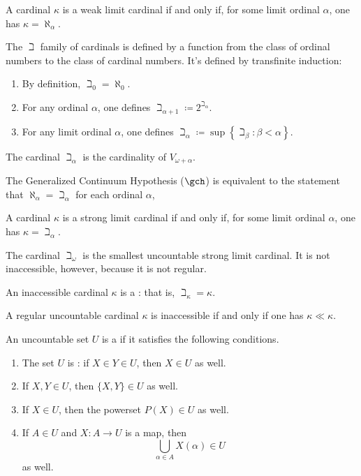 \begin{eg}
	A cardinal $ \kappa $ is a weak limit cardinal if and only if,
	for some limit ordinal $ \alpha $, one has $ \kappa = \aleph_{\alpha} $.
\end{eg}

\begin{eg}
	The $\beth$ family of cardinals is defined by a function from the class of ordinal numbers to the class of cardinal numbers.
	It's defined by transfinite induction:
	\begin{enumerate}
		\item By definition, $ \beth_0 = \aleph_0 $.
		\item For any ordinal $ \alpha $, one defines $ \beth_{\alpha+1} \coloneq 2^{\beth_{\alpha}} $.
		\item For any limit ordinal $ \alpha $,
			one defines $ \beth_{\alpha} \coloneq \sup \left\{ \beth_{\beta} : \beta < \alpha \right\} $.
	\end{enumerate}
	The cardinal $ \beth_{\alpha} $ is the cardinality of $ V_{\omega+\alpha} $.

	The Generalized Continuum Hypothesis ($ \gch $) is equivalent to the statement that
	$ \aleph_{\alpha} = \beth_{\alpha} $ for each ordinal $ \alpha $,	
	
	A cardinal $ \kappa $ is a strong limit cardinal if and only if,
	for some limit ordinal $ \alpha $, one has $ \kappa = \beth_{\alpha} $.

	The cardinal $ \beth_{\omega} $ is
	the smallest uncountable strong limit cardinal.
	It is not inaccessible, however,
	because it is not regular.

	An inaccessible cardinal $ \kappa $ is
	a :
	that is, $ \beth_{\kappa} = \kappa $.
\end{eg}

\begin{nul}
	A regular uncountable cardinal $ \kappa $
	is inaccessible if and only if
	one has $ \kappa \ll \kappa $.
\end{nul}

\begin{definition}%
\label{dfn:uni}
	An uncountable set $ U $ is a  if it satisfies the following conditions.
	\begin{enumerate}
		\item The set $ U $ is :
			if $ X \in Y \in U $, then $ X \in U $ as well.
		\item If $ X, Y \in U $, then $ \{X,Y\} \in U $ as well.
		\item If $ X \in U $, then the powerset $ P(X) \in U $ as well.
		\item If $ A \in U $ and $ X \colon A \to U $ is a map, then
		\[ \bigcup_{\alpha\in A}X(\alpha) \in U \]
		as well.
	\end{enumerate}
\end{definition}

